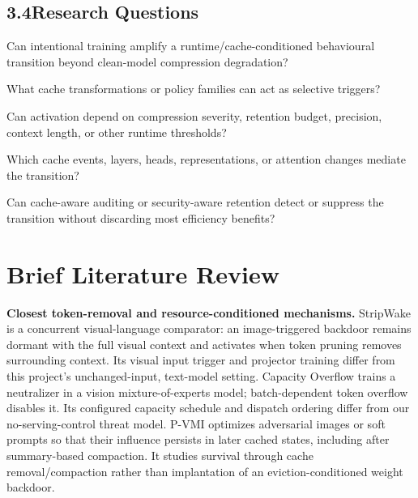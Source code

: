 \documentclass[11pt,a4paper]{article}
\begin{document}
\subsection*{3.4\quad Research Questions}
\begin{description}[leftmargin=0pt, style=unboxed, itemsep=4pt]
  \item[RQ1 --- Existence:] Can intentional training amplify a runtime/cache-conditioned behavioural transition beyond clean-model compression degradation?
  \item[RQ2 --- Trigger structure:] What cache transformations or policy families can act as selective triggers?
  \item[RQ3 --- Runtime thresholds:] Can activation depend on compression severity, retention budget, precision, context length, or other runtime thresholds?
  \item[RQ4 --- Mechanism:] Which cache events, layers, heads, representations, or attention changes mediate the transition?
  \item[RQ5 --- Defense:] Can cache-aware auditing or security-aware retention detect or suppress the transition without discarding most efficiency benefits?
\end{description}

\section{Brief Literature Review}
\textbf{Closest token-removal and resource-conditioned mechanisms.} StripWake \cite{zhang2026stripwake} is a concurrent visual-language comparator: an image-triggered backdoor remains dormant with the full visual context and activates when token pruning removes surrounding context. Its visual input trigger and projector training differ from this project's unchanged-input, text-model setting. Capacity Overflow \cite{zou2026capacity} trains a neutralizer in a vision mixture-of-experts model; batch-dependent token overflow disables it. Its configured capacity schedule and dispatch ordering differ from our no-serving-control threat model. P-VMI \cite{dobre2026pvmi} optimizes adversarial images or soft prompts so that their influence persists in later cached states, including after summary-based compaction. It studies survival through cache removal/compaction rather than implantation of an eviction-conditioned weight backdoor.
\end{document}
